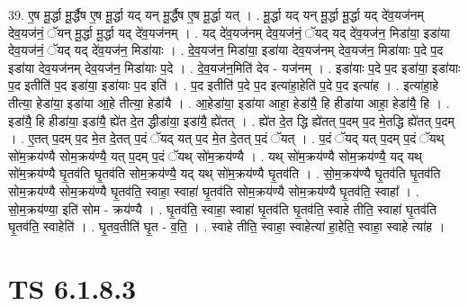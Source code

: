 \documentclass[17pt]{extarticle}
\begin{document}
39. ए॒ष मू॒र्द्धा मू॒र्द्धैष ए॒ष मू॒र्द्धा यद् यन् मू॒र्द्धैष ए॒ष मू॒र्द्धा यत् । . मू॒र्द्धा यद् यन् मू॒र्द्धा मू॒र्द्धा यद् दे॑व॒यज॑नम् देव॒यज॑नं॒ ॅयन् मू॒र्द्धा मू॒र्द्धा यद् दे॑व॒यज॑नम् । . यद् दे॑व॒यज॑नम् देव॒यज॑नं॒ ॅयद् यद् दे॑व॒यज॑न॒ मिडा॑या॒ इडा॑या देव॒यज॑नं॒ ॅयद् यद् दे॑व॒यज॑न॒ मिडा॑याः । . दे॒व॒यज॑न॒ मिडा॑या॒ इडा॑या देव॒यज॑नम् देव॒यज॑न॒ मिडा॑याः प॒दे प॒द इडा॑या देव॒यज॑नम् देव॒यज॑न॒ मिडा॑याः प॒दे । . दे॒व॒यज॑न॒मिति॑ देव - यज॑नम् । . इडा॑याः प॒दे प॒द इडा॑या॒ इडा॑याः प॒द इतीति॑ प॒द इडा॑या॒ इडा॑याः प॒द इति॑ । . प॒द इतीति॑ प॒दे प॒द इत्या॑हा॒हेति॑ प॒दे प॒द इत्या॑ह । . इत्या॑हा॒हे तीत्या॒ हेडा॑या॒ इडा॑या आ॒हे तीत्या॒ हेडा॑यै । . आ॒हेडा॑या॒ इडा॑या आहा॒ हेडा॑यै॒ हि हीडा॑या आहा॒ हेडा॑यै॒ हि । . इडा॑यै॒ हि हीडा॑या॒ इडा॑यै॒ ह्ये॑त दे॒त द्धीडा॑या॒ इडा॑यै॒ ह्ये॑तत् । . ह्ये॑त दे॒त द्धि ह्ये॑तत् प॒दम् प॒द मे॒तद्धि ह्ये॑तत् प॒दम् । . ए॒तत् प॒दम् प॒द मे॒त दे॒तत् प॒दं ॅयद् यत् प॒द मे॒त दे॒तत् प॒दं ॅयत् । . प॒दं ॅयद् यत् प॒दम् प॒दं ॅयथ् सो॑म॒क्रय॑ण्यै सोम॒क्रय॑ण्यै॒ यत् प॒दम् प॒दं ॅयथ् सो॑म॒क्रय॑ण्यै । . यथ् सो॑म॒क्रय॑ण्यै सोम॒क्रय॑ण्यै॒ यद् यथ् सो॑म॒क्रय॑ण्यै घृ॒तव॑ति घृ॒तव॑ति सोम॒क्रय॑ण्यै॒ यद् यथ् सो॑म॒क्रय॑ण्यै घृ॒तव॑ति । . सो॒म॒क्रय॑ण्यै घृ॒तव॑ति घृ॒तव॑ति सोम॒क्रय॑ण्यै सोम॒क्रय॑ण्यै घृ॒तव॑ति॒ स्वाहा॒ स्वाहा॑ घृ॒तव॑ति सोम॒क्रय॑ण्यै सोम॒क्रय॑ण्यै घृ॒तव॑ति॒ स्वाहा᳚ । . सो॒म॒क्रय॑ण्या॒ इति॑ सोम - क्रय॑ण्यै । . घृ॒तव॑ति॒ स्वाहा॒ स्वाहा॑ घृ॒तव॑ति घृ॒तव॑ति॒ स्वाहे तीति॒ स्वाहा॑ घृ॒तव॑ति घृ॒तव॑ति॒ स्वाहेति॑ । . घृ॒तव॒तीति॑ घृ॒त - व॒ति॒ । . स्वाहे तीति॒ स्वाहा॒ स्वाहेत्या॑ हा॒हेति॒ स्वाहा॒ स्वाहे त्या॑ह । \newline
\pagebreak
{}

\section{ TS 6.1.8.3 }
\end{document}
